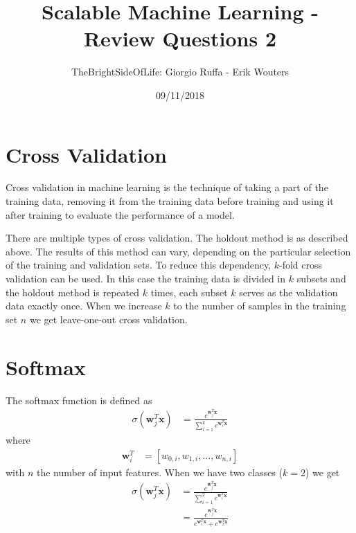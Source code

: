 \documentclass[a4paper]{article}
\title{Scalable Machine Learning - Review Questions 2}
\author{TheBrightSideOfLife: Giorgio Ruffa - Erik Wouters}
\date{09/11/2018}
\begin{document}
\maketitle

\section{Cross Validation}

Cross validation in machine learning is the technique of taking a part of the training data, removing it from the training data before training and using it after training to evaluate the performance of a model.

There are multiple types of cross validation. The holdout method is as described above. The results of this method can vary, depending on the particular selection of the training and validation sets. To reduce this dependency, $k$-fold cross validation can be used. In this case the training data is divided in $k$ subsets and the holdout method is repeated $k$ times, each subset $k$ serves as the validation data exactly once. When we increase $k$ to the number of samples in the training set $n$ we get leave-one-out cross validation.


\section{Softmax}
The softmax function is defined as
\begin{align}
\sigma(\mathbf{w}^T_j\mathbf{x}) &= \frac{e^{\mathbf{w}^T_j\mathbf{x}}}{\sum^k_{i=1}e^{\mathbf{w}^T_i\mathbf{x}}}
\end{align}
where
\begin{align}
\mathbf{w}^T_i &= [w_{0,i},w_{1,i},\dots,w_{n,i}]
\end{align}
with $n$ the number of input features.
When we have two classes ($k = 2$) we get
\begin{align*}
\sigma(\mathbf{w}^T_j\mathbf{x}) &= \frac{e^{\mathbf{w}^T_j\mathbf{x}}}{\sum^2_{i=1}e^{\mathbf{w}^T_i\mathbf{x}}} \\
&= \frac{e^{\mathbf{w}^T_j\mathbf{x}}}{e^{\mathbf{w}^T_1\mathbf{x}} + e^{\mathbf{w}^T_2\mathbf{x}}} \\
\end{align*}
\end{document}

